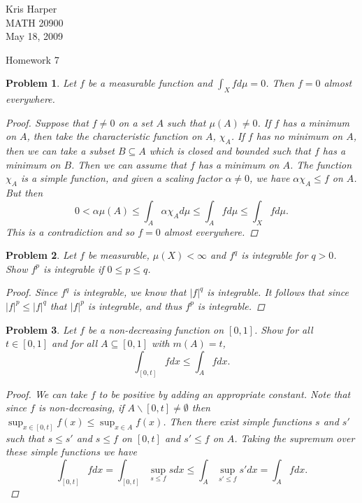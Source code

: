 \documentclass{article}
\newtheorem{problem}{Problem}
\newcommand{\dmu}{d\mu}
\begin{document}
\begin{flushright}
Kris Harper\\

MATH 20900\\

May 18, 2009
\end{flushright}

\begin{center}
Homework 7
\end{center}

\begin{problem}
Let $f$ be a measurable function and $\int_X f \dmu = 0$. Then $f = 0$ almost everywhere.
\begin{proof}
Suppose that $f \neq 0$ on a set $A$ such that $\mu(A) \neq 0$. If $f$ has a minimum on $A$, then take the characteristic function on $A$, $\chi_A$. If $f$ has no minimum on $A$, then we can take a subset $B \subseteq A$ which is closed and bounded such that $f$ has a minimum on $B$. Then we can assume that $f$ has a minimum on $A$. The function $\chi_A$ is a simple function, and given a scaling factor $\alpha \neq 0$, we have $\alpha \chi_A \leq f$ on $A$. But then
\[
0 < \alpha \mu(A) \leq \int_A \alpha \chi_A \dmu \leq \int_A f \dmu \leq \int_X f \dmu.
\]
This is a contradiction and so $f = 0$ almost everywhere.
\end{proof}
\end{problem}

\begin{problem}
Let $f$ be measurable, $\mu(X) < \infty$ and $f^q$ is integrable for $q > 0$. Show $f^p$ is integrable if $0 \leq p \leq q$.
\begin{proof}
Since $f^q$ is integrable, we know that $|f|^q$ is integrable. It follows that since $|f|^p \leq |f|^q$ that $|f|^p$ is integrable, and thus $f^p$ is integrable.
\end{proof}
\end{problem}

\begin{problem}
Let $f$ be a non-decreasing function on $[0,1]$. Show for all $t \in [0,1]$ and for all $A \subseteq [0,1]$ with $m(A) = t$,
\[
\int_{[0,t]} f dx \leq \int_A f dx.
\]
\begin{proof}
We can take $f$ to be positive by adding an appropriate constant. Note that since $f$ is non-decreasing, if $A \backslash [0,t] \neq \emptyset$ then $\sup_{x \in [0,t]} f(x) \leq \sup_{x \in A} f(x)$. Then there exist simple functions $s$ and $s'$ such that $s \leq s'$ and $s \leq f$ on $[0,t]$ and $s' \leq f$ on $A$. Taking the supremum over these simple functions we have
\[
\int_{[0,t]} f dx = \int_{[0,t]} \sup_{s \leq f} s dx \leq \int_A \sup_{s' \leq f} s' dx = \int_A f dx.
\]
\end{proof}
\end{problem}
\end{document}
